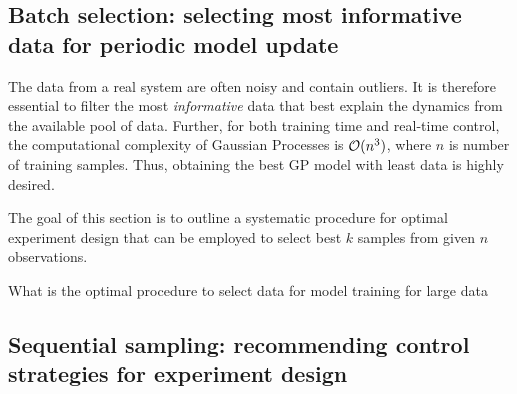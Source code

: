 \subsection{Batch selection: selecting most informative data for periodic model update}

The data from a real system are often noisy and contain outliers. 
It is therefore essential to filter the most \textit{informative} data that best explain the dynamics from the available pool of data.
Further, for both training time and real-time control, the computational complexity of Gaussian Processes is $\mathcal{O}(n^3)$, where $n$ is number of training samples. Thus, obtaining the best GP model with least data is highly desired.

The goal of this section is to outline a systematic procedure for optimal experiment design that can be employed to select best $k$ samples from given $n$ observations.

What is the optimal procedure to select data for model training for large data

\begin{figure}[h!]
	\centering
	\caption{}
	\captionsetup{justification=centering}
	\label{F:}
\end{figure}

\subsection{Sequential sampling: recommending control strategies for experiment design }


\begin{figure}[h!]
	\centering
	\caption{}
	\captionsetup{justification=centering}
	\label{F:}
\end{figure}
